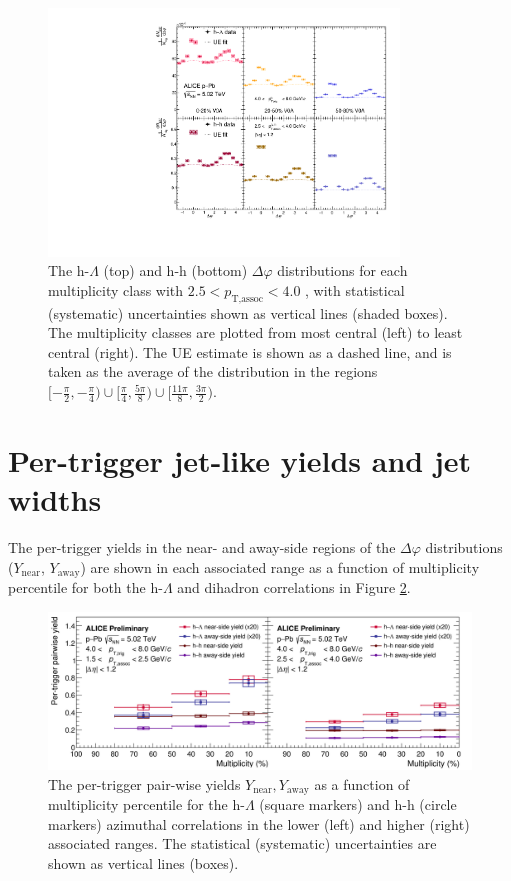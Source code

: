 \begin{figure}[h!]
\centering
\includegraphics[width=0.83\textwidth]{figures/results/dphi_final_highpt.pdf}
\caption{The h-$\Lambda$ (top) and h-h (bottom) $\Delta\varphi$ distributions for each multiplicity class with $2.5 < p_{\text{T,assoc}} < 4.0$ \GeVc, with statistical (systematic) uncertainties shown as vertical lines (shaded boxes). The multiplicity classes are plotted from most central (left) to least central (right). The UE estimate is shown as a dashed line, and is taken as the average of the distribution in the regions $[-\frac{\pi}{2}, -\frac{\pi}{4}) \cup [\frac{\pi}{4}, \frac{5\pi}{8}) \cup [\frac{11\pi}{8}, \frac{3\pi}{2})$.}
\label{fig:dphi_final_highpt}
\end{figure}

\section{Per-trigger jet-like yields and jet widths}
\label{sec:jet_like_yield_width}

The per-trigger yields in the near- and away-side regions of the $\Delta\varphi$ distributions ($Y_{\text{near}}$, $Y_{\text{away}}$) are shown in each associated \pt range as a function of multiplicity percentile for both the h-$\Lambda$ and dihadron correlations in Figure \ref{fig:pairwise_yield}.

\begin{figure}[h!]
\centering
\includegraphics[width=\textwidth]{figures/results/pairwise_plot.png}
\caption{The per-trigger pair-wise yields $Y_{\text{near}}, Y_{\text{away}}$ as a function of multiplicity percentile for the h-$\Lambda$ (square markers) and h-h (circle markers) azimuthal correlations in the lower (left) and higher (right) associated \pt ranges. The statistical (systematic) uncertainties are shown as vertical lines (boxes).}
\label{fig:pairwise_yield}
\end{figure}

